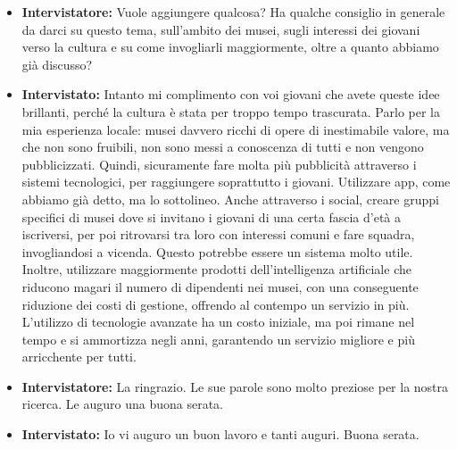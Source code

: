 \documentclass{article}
\begin{document}
\begin{itemize}
    \item \textbf{Intervistatore:} Vuole aggiungere qualcosa? Ha qualche consiglio in generale da darci su questo tema, sull’ambito dei musei, sugli interessi dei giovani verso la cultura e su come invogliarli maggiormente, oltre a quanto abbiamo già discusso?
    
    \item \textbf{Intervistato:} Intanto mi complimento con voi giovani che avete queste idee brillanti, perché la cultura è stata per troppo tempo trascurata. Parlo per la mia esperienza locale: musei davvero ricchi di opere di inestimabile valore, ma che non sono fruibili, non sono messi a conoscenza di tutti e non vengono pubblicizzati. Quindi, sicuramente fare molta più pubblicità attraverso i sistemi tecnologici, per raggiungere soprattutto i giovani. Utilizzare app, come abbiamo già detto, ma lo sottolineo. Anche attraverso i social, creare gruppi specifici di musei dove si invitano i giovani di una certa fascia d’età a iscriversi, per poi ritrovarsi tra loro con interessi comuni e fare squadra, invogliandosi a vicenda. Questo potrebbe essere un sistema molto utile.\\
    Inoltre, utilizzare maggiormente prodotti dell’intelligenza artificiale che riducono magari il numero di dipendenti nei musei, con una conseguente riduzione dei costi di gestione, offrendo al contempo un servizio in più. L’utilizzo di tecnologie avanzate ha un costo iniziale, ma poi rimane nel tempo e si ammortizza negli anni, garantendo un servizio migliore e più arricchente per tutti.
    
    \item \textbf{Intervistatore:} La ringrazio. Le sue parole sono molto preziose per la nostra ricerca. Le auguro una buona serata.
    
    \item \textbf{Intervistato:} Io vi auguro un buon lavoro e tanti auguri. Buona serata.
    
\end{itemize}
\end{document}
